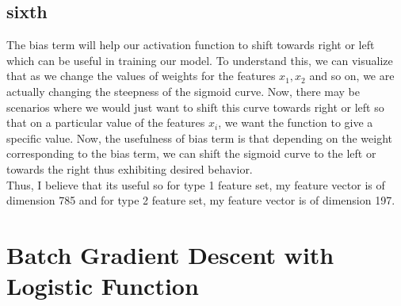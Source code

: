 \documentclass[11pt]{article}
\begin{document}
\subsection{sixth}
The bias term will help our activation function to shift towards right or left which can be useful in training our model. To understand this, we can visualize that as we change the values of weights for the features $x_1,x_2$ and so on, we are actually changing the steepness of the sigmoid curve. Now, there may be scenarios where we would just want to shift this curve towards right or left so that on a particular value of the features $x_i$, we want the function to give a specific value. Now, the usefulness of bias term is that depending on the weight corresponding to the bias term, we can shift the sigmoid curve to the left or towards the right thus exhibiting desired behavior.\\

Thus, I believe that its useful so for type 1 feature set, my feature vector is of dimension 785 and for type 2 feature set, my feature vector is of dimension 197.
\section{Batch Gradient Descent with Logistic Function}
\end{document}
